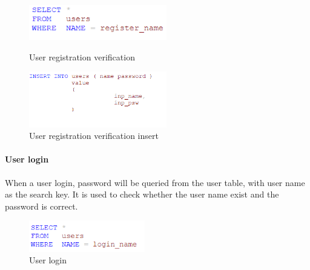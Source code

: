\begin{CJK*}{UTF8}{gbsn}
\begin{figure}[htbp]
\centering
\label{reg_ver}
\begin{minipage}[t]{0.45\textwidth}
\centering
\includegraphics[width=6cm]{reg_ver.png}
\caption{User registration verification}
\end{minipage}
\begin{minipage}[t]{0.45\textwidth}
\centering
\includegraphics[width=6cm]{reg_ins.png}
\caption{User registration verification insert}
\end{minipage}
\end{figure}


\paragraph{User login}
When a user login, password will be queried from the user table, with user name as the search key. It is used to check whether the user name exist and the password is correct.


\begin{figure}[h]
    \label{login}
    \centering
    \includegraphics[width=0.45\textwidth]{login.png}
    \caption{User login}
\end{figure}


\end{CJK*}
